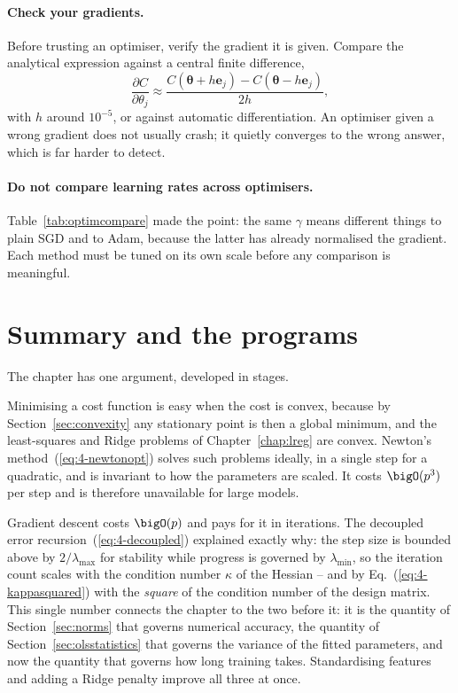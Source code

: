 \paragraph{Check your gradients.}
Before trusting an optimiser, verify the gradient it is given.  Compare the
analytical expression against a central finite difference,
\begin{equation}
  \frac{\partial C}{\partial\theta_j}
   \approx \frac{C(\bm{\theta}+h\bm{e}_j)-C(\bm{\theta}-h\bm{e}_j)}{2h},
  \label{eq:4-gradcheck}
\end{equation}
with $h$ around $10^{-5}$, or against automatic differentiation.  An optimiser
given a wrong gradient does not usually crash; it quietly converges to the
wrong answer, which is far harder to detect.

\paragraph{Do not compare learning rates across optimisers.}
Table~\ref{tab:optimcompare} made the point: the same $\gamma$ means different
things to plain SGD and to Adam, because the latter has already normalised the
gradient.  Each method must be tuned on its own scale before any comparison is
meaningful.

\section{Summary and the programs}
\label{sec:ch4summary}

The chapter has one argument, developed in stages.

Minimising a cost function is easy when the cost is convex, because by
Section~\ref{sec:convexity} any stationary point is then a global minimum, and
the least-squares and Ridge problems of Chapter~\ref{chap:lreg} are convex.
Newton's method~(\ref{eq:4-newtonopt}) solves such problems ideally, in a
single step for a quadratic, and is invariant to how the parameters are
scaled.  It costs $\bigO(p^{3})$ per step and is therefore unavailable for
large models.

Gradient descent costs $\bigO(p)$ and pays for it in iterations.  The
decoupled error recursion~(\ref{eq:4-decoupled}) explained exactly why: the
step size is bounded above by $2/\lambda_{\max}$ for stability while progress
is governed by $\lambda_{\min}$, so the iteration count scales with the
condition number $\kappa$ of the Hessian -- and by
Eq.~(\ref{eq:4-kappasquared}) with the \emph{square} of the condition number
of the design matrix.  This single number connects the chapter to the two
before it: it is the quantity of Section~\ref{sec:norms} that governs
numerical accuracy, the quantity of Section~\ref{sec:olsstatistics} that
governs the variance of the fitted parameters, and now the quantity that
governs how long training takes.  Standardising features and adding a Ridge
penalty improve all three at once.

